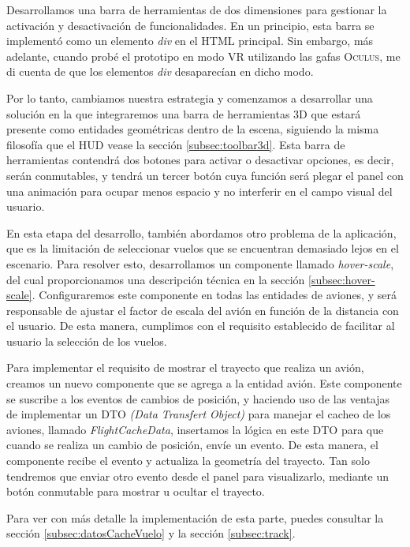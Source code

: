 \documentclass[a4paper, 11pt]{book}
\begin{document}
Desarrollamos una barra de herramientas de dos dimensiones para gestionar la activación y desactivación de funcionalidades. En un principio, esta barra se implementó como un elemento \emph{div} en el \textsc{HTML} principal. Sin embargo, más adelante, cuando probé el prototipo en modo \textsc{VR} utilizando las gafas \textsc{Oculus}, me di cuenta de que los elementos \emph{div} desaparecían en dicho modo.

Por lo tanto, cambiamos nuestra estrategia y comenzamos a desarrollar una solución en la que integraremos una barra de herramientas \textsc{3D} que estará presente como entidades geométricas dentro de la escena, siguiendo la misma filosofía que el \textsc{\gls{HUD}} vease la sección \ref{subsec:toolbar3d}. Esta barra de herramientas contendrá dos botones para activar o desactivar opciones, es decir, serán conmutables, y tendrá un tercer botón cuya función será plegar el panel con una animación para ocupar menos espacio y no interferir en el campo visual del usuario.

En esta etapa del desarrollo, también abordamos otro problema de la aplicación, que es la limitación de seleccionar vuelos que se encuentran demasiado lejos en el escenario. Para resolver esto, desarrollamos un componente llamado \emph{hover-scale}, del cual proporcionamos una descripción técnica en la sección \ref{subsec:hover-scale}. Configuraremos este componente en todas las entidades de aviones, y será responsable de ajustar el factor de escala del avión en función de la distancia con el usuario. De esta manera, cumplimos con el requisito establecido de facilitar al usuario la selección de los vuelos.

Para implementar el requisito de mostrar el trayecto que realiza un avión, creamos un nuevo componente que se agrega a la entidad avión. Este componente se suscribe a los eventos de cambios de posición, y haciendo uso de las ventajas de implementar un \textsc{\gls{DTO}} \emph{(Data Transfert Object)} para manejar el cacheo de los aviones, llamado \emph{FlightCacheData}, insertamos la lógica en este \textsc{DTO} para que cuando se realiza un cambio de posición, envíe un evento. De esta manera, el componente recibe el evento y actualiza la geometría del trayecto. Tan solo tendremos que enviar otro evento desde el panel para visualizarlo, mediante un botón conmutable para mostrar u ocultar el trayecto.

Para ver con más detalle la implementación de esta parte, puedes consultar la sección \ref{subsec:datosCacheVuelo} y la sección \ref{subsec:track}.
\end{document}
